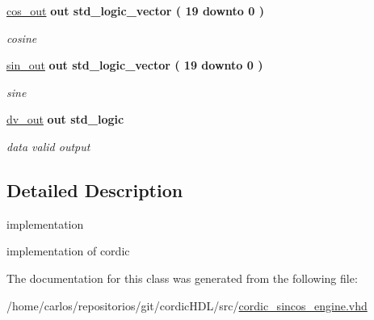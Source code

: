 \begin{DoxyCompactItemize}
\hyperlink{classcordic__sincos__engine_a5a291fb791fb54f72f5cda34a8f18fcc}{cos\+\_\+out}  {\bfseries {\bfseries \textcolor{vhdlchar}{out}\textcolor{vhdlchar}{ }}} {\bfseries \textcolor{vhdlchar}{std\+\_\+logic\+\_\+vector}\textcolor{vhdlchar}{ }\textcolor{vhdlchar}{(}\textcolor{vhdlchar}{ }\textcolor{vhdlchar}{ } \textcolor{vhdldigit}{19} \textcolor{vhdlchar}{ }\textcolor{vhdlchar}{downto}\textcolor{vhdlchar}{ }\textcolor{vhdlchar}{ } \textcolor{vhdldigit}{0} \textcolor{vhdlchar}{ }\textcolor{vhdlchar}{)}\textcolor{vhdlchar}{ }} 
\begin{DoxyCompactList}\small\item\em cosine \end{DoxyCompactList}\item 
\mbox{\label{classcordic__sincos__engine_a4ea3e6f1bf9f57dd8df535df4fd2e4c4}} 
\hyperlink{classcordic__sincos__engine_a4ea3e6f1bf9f57dd8df535df4fd2e4c4}{sin\+\_\+out}  {\bfseries {\bfseries \textcolor{vhdlchar}{out}\textcolor{vhdlchar}{ }}} {\bfseries \textcolor{vhdlchar}{std\+\_\+logic\+\_\+vector}\textcolor{vhdlchar}{ }\textcolor{vhdlchar}{(}\textcolor{vhdlchar}{ }\textcolor{vhdlchar}{ } \textcolor{vhdldigit}{19} \textcolor{vhdlchar}{ }\textcolor{vhdlchar}{downto}\textcolor{vhdlchar}{ }\textcolor{vhdlchar}{ } \textcolor{vhdldigit}{0} \textcolor{vhdlchar}{ }\textcolor{vhdlchar}{)}\textcolor{vhdlchar}{ }} 
\begin{DoxyCompactList}\small\item\em sine \end{DoxyCompactList}\item 
\mbox{\label{classcordic__sincos__engine_ae92cdb7f7c538e1a82d39b9f28ce3ed2}} 
\hyperlink{classcordic__sincos__engine_ae92cdb7f7c538e1a82d39b9f28ce3ed2}{dv\+\_\+out}  {\bfseries {\bfseries \textcolor{vhdlchar}{out}\textcolor{vhdlchar}{ }}} {\bfseries \textcolor{vhdlchar}{std\+\_\+logic}\textcolor{vhdlchar}{ }} 
\begin{DoxyCompactList}\small\item\em data valid output \end{DoxyCompactList}\end{DoxyCompactItemize}


\subsection{Detailed Description}
implementation 

implementation of cordic 

The documentation for this class was generated from the following file\+:\begin{DoxyCompactItemize}
\item 
/home/carlos/repositorios/git/cordic\+H\+D\+L/src/\hyperlink{cordic__sincos__engine_8vhd}{cordic\+\_\+sincos\+\_\+engine.\+vhd}\end{DoxyCompactItemize}
